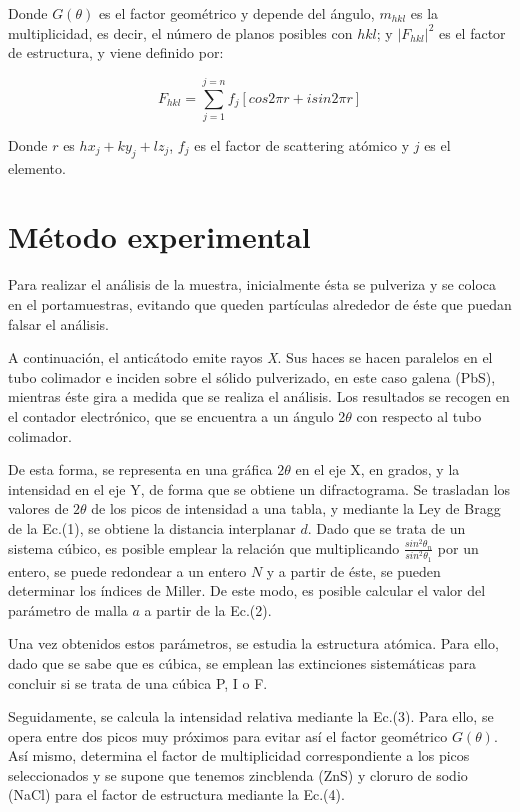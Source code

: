 \documentclass[a4paper,twocolumn,10pt]{article}
\begin{document}
Donde $G(\theta)$ es el factor geométrico y depende del ángulo, $m_{hkl}$ es la multiplicidad, es decir, el número de planos posibles con $hkl$; y $|F_{hkl}|^2$ es el factor de estructura, y viene definido por:

\begin{equation}
F_{hkl} = \sum_{j=1}^{j=n} f_j[cos2\pi r  + isin2\pi r]
\end{equation}


Donde $r$ es $hx_j + ky_j + lz_j$, $f_j$ es el factor de scattering atómico y $j$ es el elemento.
\section{Método experimental}

 Para realizar el análisis de la muestra, inicialmente ésta se pulveriza y se coloca en el portamuestras, evitando que queden partículas alrededor de éste que puedan falsar el análisis. 
 
  A continuación, el anticátodo emite rayos \textit{X}. Sus  haces se hacen paralelos en el tubo colimador e inciden sobre el sólido pulverizado, en este caso galena (PbS), mientras éste gira a medida que se realiza el análisis. Los resultados se recogen en el contador electrónico, que se encuentra a un ángulo 2$\theta$ con respecto al tubo colimador. 
  
 De esta forma, se representa en una gráfica  $2\theta$ en el eje X, en grados, y la intensidad en el eje Y, de forma que se obtiene un difractograma. Se trasladan los valores de $2\theta$ de los picos de intensidad a una tabla, y mediante la Ley de Bragg de la Ec.(1), se obtiene la distancia interplanar $d$. Dado que se trata de un sistema cúbico, es posible emplear la relación que multiplicando $\frac{sin^2\theta_n}{sin^2\theta_1}$ por un entero, se puede redondear a un entero $N$ y a partir de éste, se pueden determinar los índices de Miller. De este modo, es posible calcular el valor del parámetro de malla $a$ a partir de la Ec.(2).

Una vez obtenidos estos parámetros, se estudia la estructura atómica. Para ello, dado que se sabe que es cúbica, se emplean las extinciones sistemáticas para concluir si se trata de una cúbica P, I o F.

Seguidamente, se calcula la intensidad relativa mediante la Ec.(3). Para ello, se opera entre dos picos muy próximos para evitar así el factor geométrico $G(\theta)$. Así mismo,  determina el factor de multiplicidad correspondiente a los picos seleccionados y se supone que tenemos zincblenda (ZnS) y cloruro de sodio (NaCl) para el factor de estructura mediante la Ec.(4).
\end{document}
